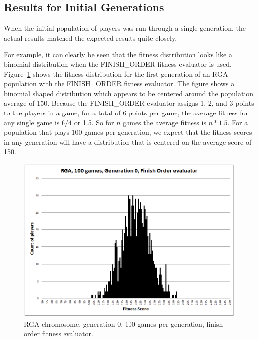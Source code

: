 \subsection{Results for Initial Generations}

When the initial population of players was run through a single generation, the
actual results matched the expected results quite closely. 

For example, it can clearly be seen that the fitness distribution looks like a
binomial distribution when the FINISH\_ORDER fitness evaluator is used.
Figure~\ref{figure-RGA-G000-N100-FO-initial_fitness} shows the fitness
distribution for the first generation of an RGA population with the
FINISH\_ORDER fitness evaluator. The figure shows a binomial shaped distribution
which appears to be centered around the population average of 150. Because the
FINISH\_ORDER evaluator assigns 1, 2, and 3 points to the players in a game, for
a total of 6 points per game, the average fitness for any single game is \(6/4\)
or 1.5. So for \(n\) games the average fitness is \(n * 1.5\).
For a population that plays 100 games per generation, we expect that the fitness
scores in any generation will have a distribution that is centered on the
average score of 150.

\begin{figure}[htbp]
\centerline{\includegraphics[width=0.75\columnwidth]{Figures/RGA_1024_G000_N100_FO.png}}
\caption[RGA Fitness Distribution, Initial Generation]{RGA chromosome,
generation 0, 100 games per generation, finish order fitness evaluator.}
\label{figure-RGA-G000-N100-FO-initial_fitness}
\end{figure}


